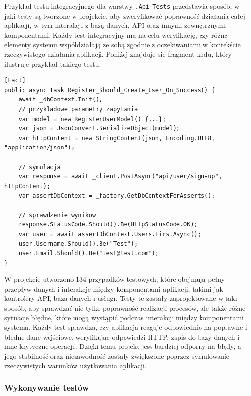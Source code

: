 \documentclass[twoside]{projektInzynierskiMS1}
\begin{document}
\newpage

\noindent 
Przykład testu integracyjnego dla warstwy \texttt{.Api.Tests} przedstawia sposób, w jaki testy są tworzone w projekcie, aby zweryfikować poprawność działania całej aplikacji, w tym interakcji z bazą danych, API oraz innymi zewnętrznymi komponentami. Każdy test integracyjny ma na celu weryfikację, czy różne elementy systemu współdziałają ze sobą zgodnie z oczekiwaniami w kontekście rzeczywistego działania aplikacji. Poniżej znajduje się fragment kodu, który ilustruje przykład takiego testu.

\vspace{0.5cm}
\begin{lstlisting}[language=CSharp]
[Fact]
public async Task Register_Should_Create_User_On_Success() {
    await _dbContext.Init();
    // przykladowe parametry zapytania
    var model = new RegisterUserModel() {...}; 
    var json = JsonConvert.SerializeObject(model);
    var httpContent = new StringContent(json, Encoding.UTF8, "application/json");

    // symulacja
    var response = await _client.PostAsync("api/user/sign-up", httpContent);
    var assertDbContext = _factory.GetDbContextForAsserts();

    // sprawdzenie wynikow
    response.StatusCode.Should().Be(HttpStatusCode.OK);
    var user = await assertDbContext.Users.FirstAsync();
    user.Username.Should().Be("Test");
    user.Email.Should().Be("test@test.com");
}
\end{lstlisting}
\vspace{0.5cm}

\noindent
W projekcie utworzono 134 przypadków testowych, które obejmują pełny przepływ danych i interakcje między komponentami aplikacji, takimi jak kontrolery API, baza danych i usługi. Testy te zostały zaprojektowane w taki sposób, aby sprawdzać nie tylko poprawność realizacji procesów, ale także różne sytuacje błędne, które mogą wystąpić podczas interakcji między komponentami systemu. Każdy test sprawdza, czy aplikacja reaguje odpowiednio na poprawne i błędne dane wejściowe, weryfikując odpowiedzi HTTP, zapis do bazy danych i inne krytyczne operacje. Dzięki temu projekt jest bardziej odporny na błędy, a jego stabilność oraz niezawodność zostały zwiększone poprzez symulowanie rzeczywistych warunków użytkowania aplikacji.

\newpage

\subsubsection{Wykonywanie testów}
\end{document}
